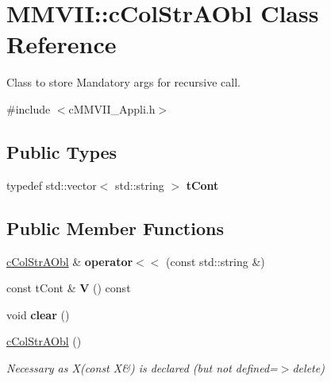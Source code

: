 \hypertarget{classMMVII_1_1cColStrAObl}{}\section{M\+M\+V\+II\+:\+:c\+Col\+Str\+A\+Obl Class Reference}
\label{classMMVII_1_1cColStrAObl}


Class to store Mandatory args for recursive call.  




{\ttfamily \#include $<$c\+M\+M\+V\+I\+I\+\_\+\+Appli.\+h$>$}

\subsection*{Public Types}
\begin{DoxyCompactItemize}
\item 
typedef std\+::vector$<$ std\+::string $>$ {\bfseries t\+Cont}\hypertarget{classMMVII_1_1cColStrAObl_a8f89d3a74056bf161097197a7dd6cb16}{}\label{classMMVII_1_1cColStrAObl_a8f89d3a74056bf161097197a7dd6cb16}

\end{DoxyCompactItemize}
\subsection*{Public Member Functions}
\begin{DoxyCompactItemize}
\item 
\hyperlink{classMMVII_1_1cColStrAObl}{c\+Col\+Str\+A\+Obl} \& {\bfseries operator$<$$<$} (const std\+::string \&)\hypertarget{classMMVII_1_1cColStrAObl_a7b3c61e9ab700b9cc43e6cf312c3a0b8}{}\label{classMMVII_1_1cColStrAObl_a7b3c61e9ab700b9cc43e6cf312c3a0b8}

\item 
const t\+Cont \& {\bfseries V} () const \hypertarget{classMMVII_1_1cColStrAObl_a83922662bf9afb260fb094dd33ff0c21}{}\label{classMMVII_1_1cColStrAObl_a83922662bf9afb260fb094dd33ff0c21}

\item 
void {\bfseries clear} ()\hypertarget{classMMVII_1_1cColStrAObl_a60390955484f923bc134cbb6c10a28c8}{}\label{classMMVII_1_1cColStrAObl_a60390955484f923bc134cbb6c10a28c8}

\item 
\hyperlink{classMMVII_1_1cColStrAObl_a712169a13a601da05beac6e5a539e17a}{c\+Col\+Str\+A\+Obl} ()\hypertarget{classMMVII_1_1cColStrAObl_a712169a13a601da05beac6e5a539e17a}{}\label{classMMVII_1_1cColStrAObl_a712169a13a601da05beac6e5a539e17a}

\begin{DoxyCompactList}\small\item\em Necessary as X(const X\&) is declared (but not defined=$>$delete) \end{DoxyCompactList}\end{DoxyCompactItemize}

